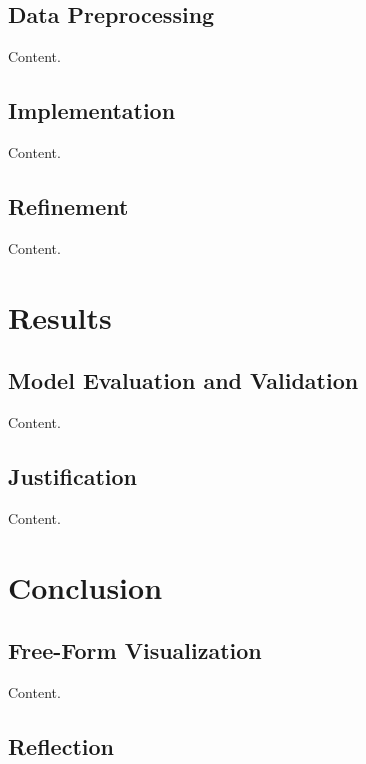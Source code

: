 \documentclass{article}
\begin{document}
\subsection{Data Preprocessing}

Content.

\subsection{Implementation}

Content.

\subsection{Refinement}

Content.

\section{Results}

\subsection{Model Evaluation and Validation}

Content.

\subsection{Justification}

Content.

\section{Conclusion}

\subsection{Free-Form Visualization}

Content.

\subsection{Reflection}
\end{document}

